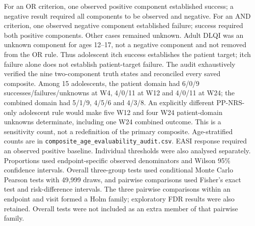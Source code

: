 For an OR criterion, one observed positive component established success; a negative result required all components to be observed and negative. For an AND criterion, one observed negative component established failure; success required both positive components. Other cases remained unknown. Adult DLQI was an unknown component for ages 12--17, not a negative component and not removed from the OR rule. Thus adolescent itch success establishes the patient target; itch failure alone does not establish patient-target failure. The audit exhaustively verified the nine two-component truth states and reconciled every saved composite. Among 15 adolescents, the patient domain had 6/0/9 successes/failures/unknowns at W4, 4/0/11 at W12 and 4/0/11 at W24; the combined domain had 5/1/9, 4/5/6 and 4/3/8. An explicitly different PP-NRS-only adolescent rule would make five W12 and four W24 patient-domain unknowns determinate, including one W24 combined outcome. This is a sensitivity count, not a redefinition of the primary composite. Age-stratified counts are in \texttt{composite\_age\_evaluability\_audit.csv}. EASI response required an observed positive baseline. Individual thresholds were also analysed separately. Proportions used endpoint-specific observed denominators and Wilson 95\% confidence intervals. Overall three-group tests used conditional Monte Carlo Pearson tests with 49,999 draws, and pairwise comparisons used Fisher's exact test and risk-difference intervals. The three pairwise comparisons within an endpoint and visit formed a Holm family; exploratory FDR results were also retained. Overall tests were not included as an extra member of that pairwise family.

